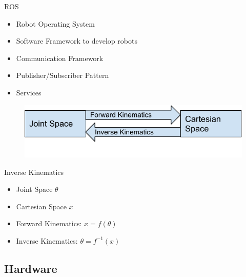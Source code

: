 \documentclass[t]{beamer}
\begin{document}
\begin{frame}{ROS}
\begin{itemize}
	\item Robot Operating System
	\item Software Framework to develop robots
	\item Communication Framework
	\item Publisher/Subscriber Pattern
	\item Services
\end{itemize}

\begin{figure}
	\includegraphics[scale=0.6]{assets/chpt_basics/Kinematics}
\end{figure}

\end{frame}

\begin{frame}{Inverse Kinematics}
\begin{itemize}
	\item Joint Space $\theta$
	\item Cartesian Space $x$
	\item Forward Kinematics: $x = f(\theta)$
	\item Inverse Kinematics: $\theta = f^{-1}(x)$
\end{itemize}
\end{frame}

\subsection{Hardware}
\end{document}
